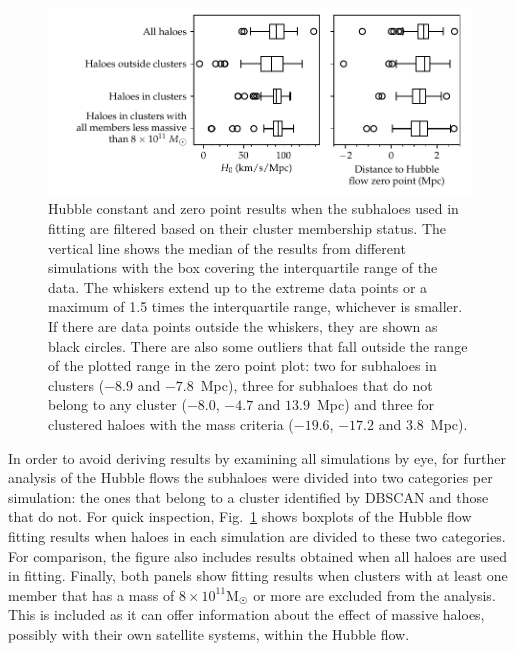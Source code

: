 \documentclass[english, oneside]{HYgradu}
\begin{document}
\begin{figure}
    \centering
    \includegraphics{kuvat/clusteredHFparameters.pdf}
    \caption{Hubble constant and zero point results when the subhaloes used in fitting are filtered based on their cluster membership status. The vertical line shows the median of the results from different simulations with the box covering the interquartile range of the data. The whiskers extend up to the extreme data points or a maximum of 1.5 times the interquartile range, whichever is smaller. If there are data points outside the whiskers, they are shown as black circles. There are also some outliers that fall outside the range of the plotted range in the zero point plot: two for subhaloes in clusters ($-8.9$ and $-7.8$~Mpc), three for subhaloes that do not belong to any cluster ($-8.0$, $-4.7$ and $13.9$~Mpc) and three for clustered haloes with the mass criteria ($-19.6$, $-17.2$ and $3.8$~Mpc).}\label{fig:clusteredHFparameters}
\end{figure}

In order to avoid deriving results by examining all simulations by eye, for further analysis of the Hubble flows the subhaloes were divided into two categories per simulation: the ones that belong to a cluster identified by DBSCAN and those that do not. For quick inspection, Fig.~\ref{fig:clusteredHFparameters} shows boxplots of the Hubble flow fitting results when haloes in each simulation are divided to these two categories. For comparison, the figure also includes results obtained when all haloes are used in fitting. Finally, both panels show fitting results when clusters with at least one member that has a mass of $8 \times 10^{11} \mathrm{M}_{\astrosun}$ or more are excluded from the analysis. This is included as it can offer information about the effect of massive haloes, possibly with their own satellite systems, within the Hubble flow.
\end{document}
